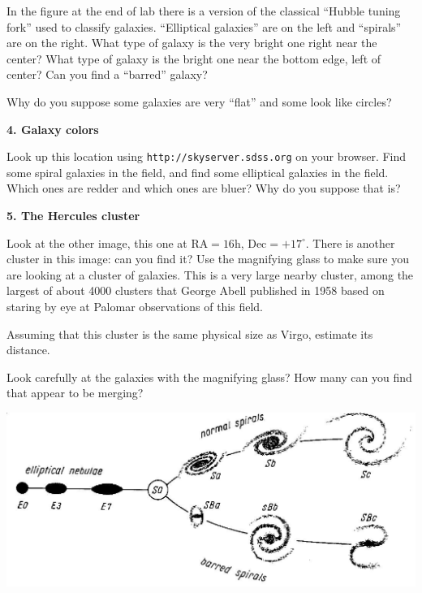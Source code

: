\noindent In the figure at the end of lab there is a version of the
classical ``Hubble tuning fork'' used to classify galaxies.
``Elliptical galaxies'' are on the left and ``spirals'' are on the
right.  What type of galaxy is the very bright one right near the
center? What type of galaxy is the bright one near the bottom edge,
left of center? Can you find a ``barred'' galaxy?

\vspace{40pt}

\noindent Why do you suppose some galaxies are very ``flat'' and some
look like circles?

\vspace{40pt}

\noindent 
{\bf 4. Galaxy colors}

\noindent Look up this location using {\tt http://skyserver.sdss.org} on your
browser. Find some spiral galaxies in the field, and find some
elliptical galaxies in the field.  Which ones are redder and which
ones are bluer? Why do you suppose that is?

\vspace{40pt}

\noindent 
{\bf 5. The Hercules cluster}

\noindent Look at the other image, this one at RA$=16$h,
Dec$=+17^\circ$. There is another cluster in this image: can you find
it? Use the magnifying glass to make sure you are looking at a cluster
of galaxies. This is a very large nearby cluster, among the largest of
about 4000 clusters that George Abell published in 1958 based on
staring by eye at Palomar observations of this field. 

\noindent Assuming that this cluster is the same physical size as
Virgo, estimate its distance. 

\vspace{40pt}

\noindent Look carefully at the galaxies with the magnifying glass?
How many can you find that appear to be merging?

\vspace{40pt}

\clearpage

\includegraphics[width=5.5in]{tune.eps}
